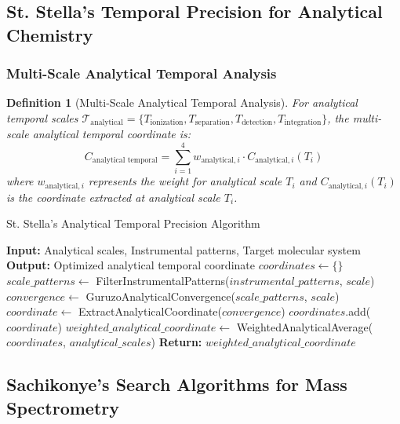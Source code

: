 \documentclass[11pt,a4paper]{article}
\newtheorem{definition}[theorem]{Definition}
\theoremstyle{remark}
\begin{document}
\subsection{St. Stella's Temporal Precision for Analytical Chemistry}

\subsubsection{Multi-Scale Analytical Temporal Analysis}

\begin{definition}[Multi-Scale Analytical Temporal Analysis]
For analytical temporal scales $\mathcal{T}_{\text{analytical}} = \{T_{\text{ionization}}, T_{\text{separation}}, T_{\text{detection}}, T_{\text{integration}}\}$, the multi-scale analytical temporal coordinate is:
\begin{equation}
C_{\text{analytical temporal}} = \sum_{i=1}^{4} w_{\text{analytical},i} \cdot C_{\text{analytical},i}(T_i)
\end{equation}
where $w_{\text{analytical},i}$ represents the weight for analytical scale $T_i$ and $C_{\text{analytical},i}(T_i)$ is the coordinate extracted at analytical scale $T_i$.
\end{definition}

\begin{algorithm}[H]
\caption{St. Stella's Analytical Temporal Precision Algorithm}
\begin{algorithmic}[1]
\State \textbf{Input:} Analytical scales, Instrumental patterns, Target molecular system
\State \textbf{Output:} Optimized analytical temporal coordinate
\State $coordinates \gets \{\}$
\State $scale\_patterns \gets$ FilterInstrumentalPatterns($instrumental\_patterns$, $scale$)
\State $convergence \gets$ GuruzoAnalyticalConvergence($scale\_patterns$, $scale$)
\State $coordinate \gets$ ExtractAnalyticalCoordinate($convergence$)
\State $coordinates$.add($coordinate$)
\EndFor
\State $weighted\_analytical\_coordinate \gets$ WeightedAnalyticalAverage($coordinates$, $analytical\_scales$)
\State \textbf{Return:} $weighted\_analytical\_coordinate$
\EndProcedure
\end{algorithmic}
\end{algorithm}

\subsection{Sachikonye's Search Algorithms for Mass Spectrometry}
\end{document}
